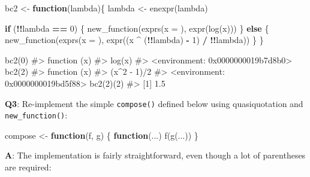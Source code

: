 \documentclass[
]{krantz}
\makeatletter
\newenvironment{Shaded}{\begin{snugshade}}{\end{snugshade}}
\newcommand{\CommentTok}[1]{\textcolor[rgb]{0.56,0.35,0.01}{\textit{#1}}}
\newcommand{\ControlFlowTok}[1]{\textcolor[rgb]{0.13,0.29,0.53}{\textbf{#1}}}
\newcommand{\DataTypeTok}[1]{\textcolor[rgb]{0.13,0.29,0.53}{#1}}
\newcommand{\DecValTok}[1]{\textcolor[rgb]{0.00,0.00,0.81}{#1}}
\newcommand{\KeywordTok}[1]{\textcolor[rgb]{0.13,0.29,0.53}{\textbf{#1}}}
\newcommand{\NormalTok}[1]{#1}
\newcommand{\OperatorTok}[1]{\textcolor[rgb]{0.81,0.36,0.00}{\textbf{#1}}}
\newcommand{\StringTok}[1]{\textcolor[rgb]{0.31,0.60,0.02}{#1}}
\newenvironment{kframe}{%
\medskip{}
\setlength{\fboxsep}{.8em}
 \def\at@end@of@kframe{}%
 \ifinner\ifhmode%
  \def\at@end@of@kframe{\end{minipage}}%
  \begin{minipage}{\columnwidth}%
 \fi\fi%
 \def\FrameCommand##1{\hskip\@totalleftmargin \hskip-\fboxsep
 \colorbox{shadecolor}{##1}\hskip-\fboxsep
     \hskip-\linewidth \hskip-\@totalleftmargin \hskip\columnwidth}%
 \MakeFramed {\advance\hsize-\width
   \@totalleftmargin\z@ \linewidth\hsize
   \@setminipage}}%
 {\par\unskip\endMakeFramed%
 \at@end@of@kframe}
\renewenvironment{Shaded}{\begin{kframe}}{\end{kframe}}
\renewcommand{\KeywordTok} [1]{\textcolor[rgb]{0.00,0.44,0.13}{{#1}}}
\renewcommand{\DataTypeTok}[1]{\textcolor[rgb]{0.56,0.13,0.00}{{#1}}}
\renewcommand{\DecValTok}  [1]{\textcolor[rgb]{0.25,0.63,0.44}{{#1}}}
\renewcommand{\StringTok}  [1]{\textcolor[rgb]{0.25,0.44,0.63}{{#1}}}
\renewcommand{\CommentTok} [1]{\textcolor[rgb]{0.38,0.63,0.69}{{#1}}}
\renewcommand{\NormalTok}  [1]{{#1}}
\makeatother
\begin{document}
\begin{Shaded}
\begin{Highlighting}[]
\NormalTok{bc2 <-}\StringTok{ }\ControlFlowTok{function}\NormalTok{(lambda)\{}
\NormalTok{  lambda <-}\StringTok{ }\KeywordTok{enexpr}\NormalTok{(lambda)}
  
  \ControlFlowTok{if}\NormalTok{ (}\OperatorTok{!!}\NormalTok{lambda }\OperatorTok{==}\StringTok{ }\DecValTok{0}\NormalTok{) \{}
    \KeywordTok{new_function}\NormalTok{(}\KeywordTok{exprs}\NormalTok{(}\DataTypeTok{x =}\NormalTok{ ), }\KeywordTok{expr}\NormalTok{(}\KeywordTok{log}\NormalTok{(x)))}
\NormalTok{  \} }\ControlFlowTok{else}\NormalTok{ \{}
    \KeywordTok{new_function}\NormalTok{(}\KeywordTok{exprs}\NormalTok{(}\DataTypeTok{x =}\NormalTok{ ), }\KeywordTok{expr}\NormalTok{((x }\OperatorTok{^}\StringTok{ }\NormalTok{(}\OperatorTok{!!}\NormalTok{lambda) }\OperatorTok{-}\StringTok{ }\DecValTok{1}\NormalTok{) }\OperatorTok{/}\StringTok{ }\OperatorTok{!!}\NormalTok{lambda))}
\NormalTok{  \}}
\NormalTok{\}}

\KeywordTok{bc2}\NormalTok{(}\DecValTok{0}\NormalTok{)}
\CommentTok{#> function (x) }
\CommentTok{#> log(x)}
\CommentTok{#> <environment: 0x0000000019b7d8b0>}
\KeywordTok{bc2}\NormalTok{(}\DecValTok{2}\NormalTok{)}
\CommentTok{#> function (x) }
\CommentTok{#> (x^2 - 1)/2}
\CommentTok{#> <environment: 0x0000000019bd5f88>}
\KeywordTok{bc2}\NormalTok{(}\DecValTok{2}\NormalTok{)(}\DecValTok{2}\NormalTok{)}
\CommentTok{#> [1] 1.5}
\end{Highlighting}
\end{Shaded}

\textbf{{Q3}}: Re-implement the simple \texttt{compose()} defined below using quasiquotation and \texttt{new\_function()}:

\begin{Shaded}
\begin{Highlighting}[]
\NormalTok{compose <-}\StringTok{ }\ControlFlowTok{function}\NormalTok{(f, g) \{}
  \ControlFlowTok{function}\NormalTok{(...) }\KeywordTok{f}\NormalTok{(}\KeywordTok{g}\NormalTok{(...))}
\NormalTok{\}}
\end{Highlighting}
\end{Shaded}

\textbf{{A}}: The implementation is fairly straightforward, even though a lot of parentheses are required:
\end{document}
